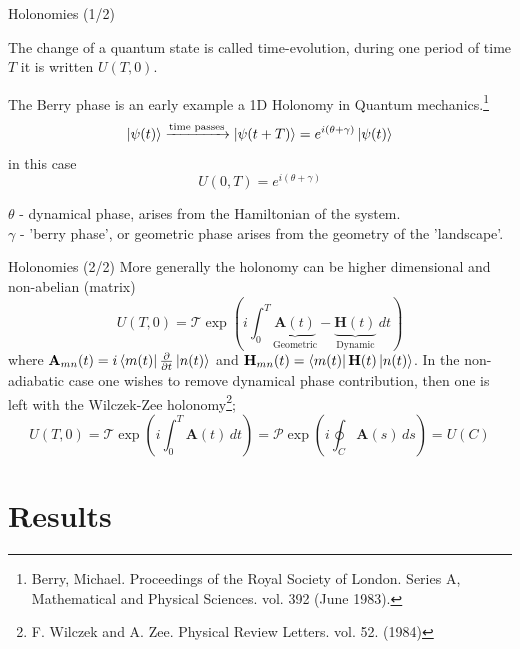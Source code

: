 \documentclass[t]{beamer}
\begin{document}
\begin{frame}{Holonomies (1/2)}

The change of a quantum state is called time-evolution, during one period of time $T$ it is written $U(T,0)$.

The Berry phase is an early example a 1D Holonomy in Quantum mechanics.\footnote{\scriptsize Berry, Michael. Proceedings of the Royal Society of London. Series A, Mathematical and Physical Sciences. vol. 392 (June 1983).}
\begin{equation}
\ket{\psi(t)} \xrightarrow{\text{time passes}} \ket{\psi(t+T)} = e^{i(\theta + \gamma)}\ket{\psi(t)}
\end{equation}
in this case
\begin{equation}
U(0,T) = e^{i(\theta + \gamma)}
\end{equation}

$\theta$ - dynamical phase, arises from the Hamiltonian of the system.\\
$\gamma$ - 'berry phase', or geometric phase arises from the geometry of the 'landscape'.
\end{frame}

\begin{frame}{Holonomies (2/2)}
More generally the holonomy can be higher dimensional and non-abelian (matrix)
\begin{equation}
U(T,0) = \mathcal{T}\exp\left(i\int_{0}^{T} \underbrace{\mathbf{A}(t)}_{\text{Geometric}} - \underbrace{\mathbf{H}(t)}_{\text{Dynamic}}\,dt\right)
\end{equation}
where $\mathbf{A}_{mn}(t) = i\bra{m(t)}\pdv{}{t}\ket{n(t)}$ and
$\mathbf{H}_{mn}(t) = \bra{m(t)}\mathbf{H}(t)\ket{n(t)}$.
In the non-adiabatic case one wishes to remove dynamical phase contribution, then one is left with the Wilczek-Zee holonomy\footnote{F. Wilczek and A. Zee. Physical Review Letters. vol. 52. (1984)};
\begin{equation}
U(T,0) = \mathcal{T}\exp\left(i\int_{0}^{T}\mathbf{A}(t)\,dt\right) = \mathcal{P}\exp\left(i\oint_{C}\mathbf{A}(s)\,ds\right) = U(C)
\end{equation}

\end{frame}


\section{Results}

\begin{frame}{}
\tableofcontents[ 
currentsubsection, 
hideothersubsections, 
sectionstyle=show/shaded, 
subsectionstyle=show/shaded, 
] 
\end{frame}
\end{document}
